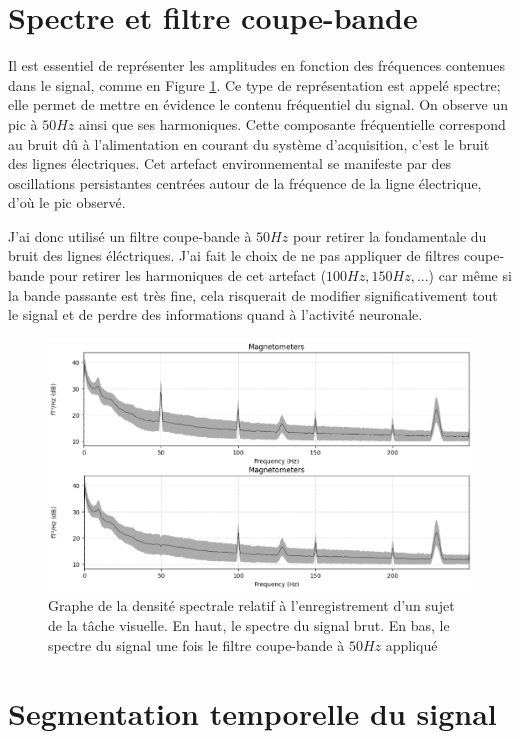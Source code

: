 \section{Spectre et filtre coupe-bande}

Il est essentiel de représenter les amplitudes en fonction des fréquences contenues dans le signal, comme en Figure \ref{fig3.4}. Ce type de représentation est appelé spectre; elle permet de mettre en évidence le contenu fréquentiel du signal.
On observe un pic à $50 Hz$ ainsi que ses harmoniques. Cette composante fréquentielle correspond au bruit dû à l'alimentation en courant du système d'acquisition, c'est le bruit des lignes électriques. Cet artefact environnemental se manifeste par des oscillations persistantes centrées autour de la fréquence de la ligne électrique, d'où le pic observé. 

\vspace{2ex}
J'ai donc utilisé un filtre coupe-bande à $50 Hz$ pour retirer la fondamentale du bruit des lignes éléctriques. J'ai fait le choix de ne pas appliquer de filtres coupe-bande pour retirer les harmoniques de cet artefact ($100 Hz, 150 Hz,...$) car même si la bande passante est très fine, cela risquerait de modifier significativement tout le signal et de perdre des informations quand à l'activité neuronale.

\begin{figure}[!ht]
    \centering
    \includegraphics[width=13cm]{spectre_effet_coupe_bande.png}
    \caption{Graphe de la densité spectrale relatif à l'enregistrement d'un sujet de la tâche visuelle. En haut, le spectre du signal brut. En bas, le spectre du signal une fois le filtre coupe-bande à $50 Hz$ appliqué}
    \label{fig3.4}
\end{figure} 

\section{Segmentation temporelle du signal}

